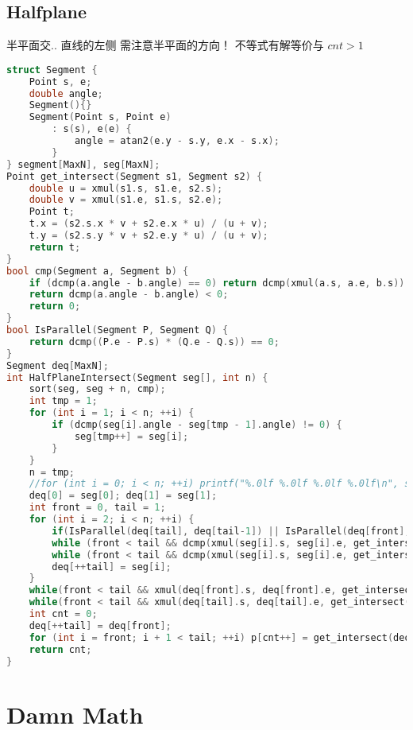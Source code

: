 \subsection{Halfplane}
 半平面交.. 直线的左侧
 需注意半平面的方向！
 不等式有解等价与 $cnt > 1$ 
\begin{lstlisting}[language=C++]
struct Segment {
	Point s, e;
	double angle;
	Segment(){}
	Segment(Point s, Point e)
		: s(s), e(e) {
			angle = atan2(e.y - s.y, e.x - s.x);
		}
} segment[MaxN], seg[MaxN];
Point get_intersect(Segment s1, Segment s2) {
	double u = xmul(s1.s, s1.e, s2.s);
	double v = xmul(s1.e, s1.s, s2.e);
	Point t;
	t.x = (s2.s.x * v + s2.e.x * u) / (u + v);
	t.y = (s2.s.y * v + s2.e.y * u) / (u + v);
	return t;
}
bool cmp(Segment a, Segment b) {
	if (dcmp(a.angle - b.angle) == 0) return dcmp(xmul(a.s, a.e, b.s)) > 0;
	return dcmp(a.angle - b.angle) < 0;
	return 0;
}
bool IsParallel(Segment P, Segment Q) {
	return dcmp((P.e - P.s) * (Q.e - Q.s)) == 0;
}
Segment deq[MaxN];
int HalfPlaneIntersect(Segment seg[], int n) {
	sort(seg, seg + n, cmp);
	int tmp = 1;
	for (int i = 1; i < n; ++i) {
		if (dcmp(seg[i].angle - seg[tmp - 1].angle) != 0) {
			seg[tmp++] = seg[i];
		}
	}
	n = tmp;
	//for (int i = 0; i < n; ++i) printf("%.0lf %.0lf %.0lf %.0lf\n", seg[i].s.x, seg[i].s.y, seg[i].e.x, seg[i].e.y);
	deq[0] = seg[0]; deq[1] = seg[1];
	int front = 0, tail = 1;
	for (int i = 2; i < n; ++i) {
		if(IsParallel(deq[tail], deq[tail-1]) || IsParallel(deq[front], deq[front+1])) return 0;
		while (front < tail && dcmp(xmul(seg[i].s, seg[i].e, get_intersect(deq[tail], deq[tail - 1]))) < 0) --tail;
		while (front < tail && dcmp(xmul(seg[i].s, seg[i].e, get_intersect(deq[front], deq[front+1]))) < 0) ++front;
		deq[++tail] = seg[i];
	}
	while(front < tail && xmul(deq[front].s, deq[front].e, get_intersect(deq[tail], deq[tail-1])) < -eps) tail--;
	while(front < tail && xmul(deq[tail].s, deq[tail].e, get_intersect(deq[front], deq[front+1])) < -eps) front++;
	int cnt = 0;
	deq[++tail] = deq[front];
	for (int i = front; i + 1 < tail; ++i) p[cnt++] = get_intersect(deq[i], deq[i+1]);
	return cnt;
}
\end{lstlisting}

\section{Damn Math}
